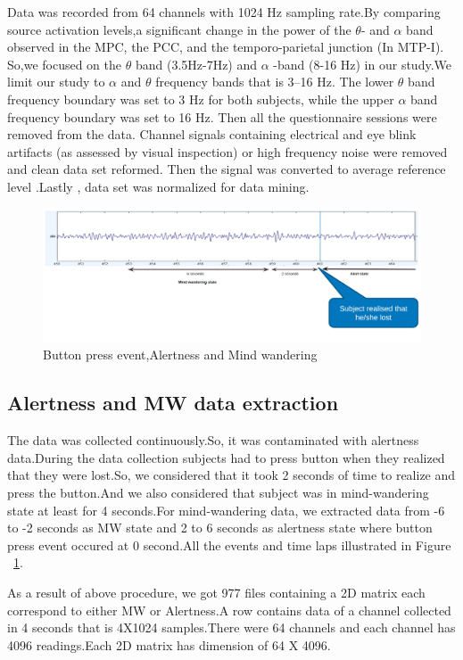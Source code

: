 Data was recorded from 64 channels with 1024 Hz sampling rate.By comparing source  activation levels,a significant change in the power of the  $\theta$- and $\alpha$ band observed in the MPC, the PCC, and the temporo-parietal junction (In MTP-I). So,we focused on the $\theta$ band (3.5Hz-7Hz) and $\alpha$ -band (8-16 Hz) in our study.We limit our study to  $\alpha$ and $\theta$  frequency bands that is 3–16 Hz. The lower $\theta$ band frequency boundary was set to 3 Hz for both subjects, while the upper $\alpha$ band frequency boundary was set to 16 Hz. Then all the questionnaire sessions were removed from the data. Channel signals containing  electrical and eye blink artifacts (as assessed by visual inspection) or high frequency noise were removed and clean data set reformed. Then the signal was converted to average reference level .Lastly , data set was normalized for data mining.
 
\begin{figure}
    \centering
    \includegraphics[width=15cm]{Pictures/single_chanel_data.png}
    \caption{Button press event,Alertness and Mind wandering}
    \label{fig:Mw_fig}
\end{figure}

\subsection{Alertness and MW data extraction}
 The data was collected continuously.So, it was contaminated with alertness data.During the data collection subjects had to press button when they realized that they were lost.So, we considered that it took 2 seconds of time to realize and press the button.And we also considered that subject was in mind-wandering state at least for 4 seconds.For mind-wandering data, we extracted data from -6 to -2 seconds as MW state and 2 to 6 seconds as alertness state where button press event occured at 0 second.All the events and time laps illustrated in Figure ~\ref{fig:Mw_fig}.
 
As a result of above procedure, we got 977 files containing a 2D matrix each correspond to either MW or Alertness.A row contains data of a channel collected in 4 seconds that is 4X1024 samples.There were 64 channels and each channel has 4096 readings.Each 2D matrix has dimension of 64 X 4096.   

